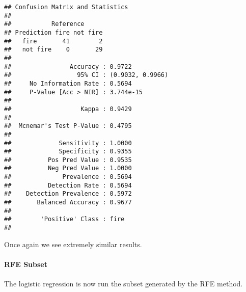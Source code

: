 \documentclass[
]{article}
\newenvironment{Shaded}{\begin{snugshade}}{\end{snugshade}}
\newcommand{\AttributeTok}[1]{\textcolor[rgb]{0.13,0.29,0.53}{#1}}
\newcommand{\CommentTok}[1]{\textcolor[rgb]{0.56,0.35,0.01}{\textit{#1}}}
\newcommand{\DecValTok}[1]{\textcolor[rgb]{0.00,0.00,0.81}{#1}}
\newcommand{\FunctionTok}[1]{\textcolor[rgb]{0.13,0.29,0.53}{\textbf{#1}}}
\newcommand{\NormalTok}[1]{#1}
\newcommand{\OtherTok}[1]{\textcolor[rgb]{0.56,0.35,0.01}{#1}}
\newcommand{\SpecialCharTok}[1]{\textcolor[rgb]{0.81,0.36,0.00}{\textbf{#1}}}
\newcommand{\StringTok}[1]{\textcolor[rgb]{0.31,0.60,0.02}{#1}}
\begin{document}
\begin{Shaded}
\end{Shaded}

\begin{verbatim}
## Confusion Matrix and Statistics
## 
##           Reference
## Prediction fire not fire
##   fire       41        2
##   not fire    0       29
##                                           
##                Accuracy : 0.9722          
##                  95% CI : (0.9032, 0.9966)
##     No Information Rate : 0.5694          
##     P-Value [Acc > NIR] : 3.744e-15       
##                                           
##                   Kappa : 0.9429          
##                                           
##  Mcnemar's Test P-Value : 0.4795          
##                                           
##             Sensitivity : 1.0000          
##             Specificity : 0.9355          
##          Pos Pred Value : 0.9535          
##          Neg Pred Value : 1.0000          
##              Prevalence : 0.5694          
##          Detection Rate : 0.5694          
##    Detection Prevalence : 0.5972          
##       Balanced Accuracy : 0.9677          
##                                           
##        'Positive' Class : fire            
## 
\end{verbatim}

Once again we see extremely similar results.

\paragraph{RFE Subset}\label{rfe-subset}

The logistic regression is now run the subset generated by the RFE
method.
\end{document}
